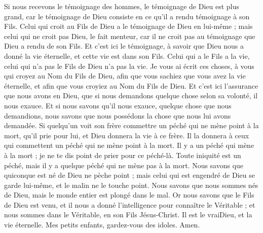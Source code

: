 \begin{multicols}{2}
Si nous recevons le témoignage des hommes, le témoignage de Dieu est plus grand, car le témoignage de Dieu consiste en ce qu'il a rendu témoignage à son Fils.
Celui qui croit au Fils de Dieu a le témoignage de Dieu en lui-même ; mais celui qui ne croit pas Dieu, le fait menteur, car il ne croit pas au témoignage que Dieu a rendu de son Fils.
Et c'est ici le témoignage, à savoir que Dieu nous a donné la vie éternelle, et cette vie est dans son Fils.
Celui qui a le Fils a la vie, celui qui n'a pas le Fils de Dieu n'a pas la vie.
Je vous ai écrit ces choses, à vous qui croyez au Nom du Fils de Dieu, afin que vous sachiez que vous avez la vie éternelle, et afin que vous croyiez au Nom du Fils de Dieu.
Et c'est ici l'assurance que nous avons en Dieu, que si nous demandons quelque chose selon sa volonté, il nous exauce.
Et si nous savons qu'il nous exauce, quelque chose que nous demandions, nous savons que nous possédons la chose que nous lui avons demandée.
Si quelqu'un voit son frère commettre un péché qui ne mène point à la mort, qu'il prie pour lui, et Dieu donnera la vie à ce frère. Il la donnera à ceux qui commettent un péché qui ne mène point à la mort. Il y a un péché qui mène à la mort ; je ne te dis point de prier pour ce péché-là.
Toute iniquité est un péché, mais il y a quelque péché qui ne mène pas à la mort.
Nous savons que quiconque est né de Dieu ne pèche point ; mais celui qui est engendré de Dieu se garde lui-même, et le malin ne le touche point.
Nous savons que nous sommes nés de Dieu, mais le monde entier est plongé dans le mal.
Or nous savons que le Fils de Dieu est venu, et il nous a donné l'intelligence pour connaître le Véritable ; et nous sommes dans le Véritable, en son Fils Jésus-Christ. Il est le vraiDieu, et la vie éternelle.
Mes petits enfants, gardez-vous des idoles. Amen.
\PPE{}
\end{multicols}
